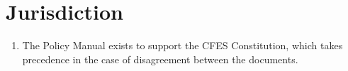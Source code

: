 \section{Jurisdiction}
\label{jurisdiction}

\begin{enumerate}
 \item
  The Policy Manual exists to support the CFES Constitution, which takes precedence in the case of disagreement between the documents.
\end{enumerate}

